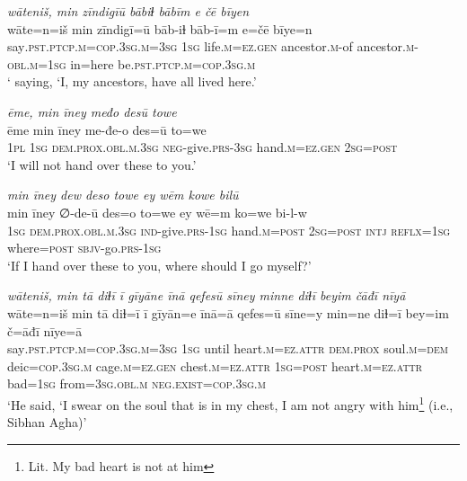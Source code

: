 \ea \label{DP.20}
\textit{wāteniš, min zīndigīū bābiɫ bābīm e čē bīyen} \\ 
\gll wāte=n=iš min zīndigī=ū bāb-iɫ bāb-ī=m e=čē bīye=n \\ 
 say\textsc{.pst}\textsc{.ptcp}\textsc{.m}\textsc{=cop}\textsc{.3sg}\textsc{.m}\textsc{=3sg} \textsc{1sg} life\textsc{.m}\textsc{=ez}\textsc{.gen} ancestor\textsc{.m}-of ancestor\textsc{.m}\textsc{-obl}\textsc{.m}\textsc{=1sg} in=here be\textsc{.pst}\textsc{.ptcp}\textsc{.m}\textsc{=cop}\textsc{.3sg}\textsc{.m} \\ 
\glt ` saying, ‘I, my ancestors, have all lived here.'
\z 
 
\ea \label{DP.22}
\textit{ēme, min īney međo desū towe} \\ 
\gll ēme min īney me-đe-o des=ū to=we \\ 
 \textsc{1pl} \textsc{1sg} \textsc{dem.prox}\textsc{.obl}\textsc{.m}\textsc{.3sg} \textsc{neg-}give\textsc{.prs}\textsc{-3sg} hand\textsc{.m}\textsc{=ez}\textsc{.gen} \textsc{2sg}\textsc{=\textsc{post}} \\ 
\glt `I will not hand over these to you.'
\z 
 
\ea \label{DP.23}
\textit{min īney dew deso towe ey wēm kowe bilū} \\ 
\gll min īney ∅-de-ū des=o to=we ey wē=m ko=we bi-l-w \\ 
 \textsc{1sg} \textsc{dem.prox}\textsc{.obl}\textsc{.m}\textsc{.3sg} \textsc{ind-}give\textsc{.prs}\textsc{-1sg} hand\textsc{.m}\textsc{=\textsc{post}} \textsc{2sg}\textsc{=\textsc{post}} \textsc{intj} \textsc{reflx}\textsc{=1sg} where\textsc{=\textsc{post}} \textsc{sbjv-}go\textsc{.prs}\textsc{-1sg} \\ 
\glt `If I hand over these to you, where should I go myself?'
\z 
 
\ea \label{DP.38}
\textit{wāteniš, min tā diɫī ī gīyāne īnā qefesū sīney minne diɫī beyim čāđī nīyā} \\ 
\gll wāte=n=iš min tā diɫ=ī ī gīyān=e īnā=ā qefes=ū sīne=y min=ne diɫ=ī bey=im č=āđī nīye=ā \\ 
 say\textsc{.pst}\textsc{.ptcp}\textsc{.m}\textsc{=cop}\textsc{.3sg}\textsc{.m}\textsc{=3sg} \textsc{1sg} until heart\textsc{.m}\textsc{=ez}.\textsc{attr} \textsc{dem.prox} soul\textsc{.m}\textsc{=dem} deic\textsc{=cop}\textsc{.3sg}\textsc{.m} cage\textsc{.m}\textsc{=ez}\textsc{.gen} chest\textsc{.m}\textsc{=ez}.\textsc{attr} \textsc{1sg}\textsc{=\textsc{post}} heart\textsc{.m}\textsc{=ez}.\textsc{attr} bad\textsc{=1sg} from\textsc{=3sg}\textsc{.obl}\textsc{.m} \textsc{\textsc{neg.}exist}\textsc{=cop}\textsc{.3sg}\textsc{.m} \\ 
\glt `He said, ‘I swear on the soul that is in my chest, I am not angry with him\footnote{Lit. My bad heart is not at him} (i.e., Sibhan Agha)'
\z 
 
